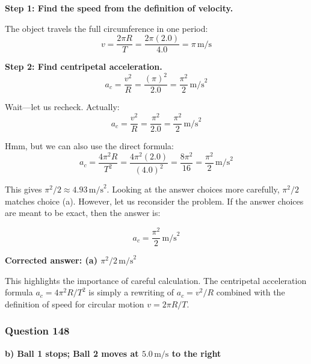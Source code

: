 \documentclass[12pt,letterpaper]{article}
\begin{document}
\begin{explanationbox}
\textbf{Step 1: Find the speed from the definition of velocity.}

The object travels the full circumference in one period:
\[
v = \frac{2\pi R}{T} = \frac{2\pi(2.0)}{4.0} = \pi\,\text{m/s}
\]

\textbf{Step 2: Find centripetal acceleration.}
\[
a_c = \frac{v^2}{R} = \frac{(\pi)^2}{2.0} = \frac{\pi^2}{2}\,\text{m/s}^2
\]

Wait---let us recheck. Actually:
\[
a_c = \frac{v^2}{R} = \frac{\pi^2}{2.0} = \frac{\pi^2}{2}\,\text{m/s}^2
\]

Hmm, but we can also use the direct formula:
\[
a_c = \frac{4\pi^2 R}{T^2} = \frac{4\pi^2(2.0)}{(4.0)^2} = \frac{8\pi^2}{16} = \frac{\pi^2}{2}\,\text{m/s}^2
\]

This gives $\pi^2/2 \approx 4.93\,\text{m/s}^2$. Looking at the answer choices more carefully, $\pi^2/2$ matches choice (a). However, let us reconsider the problem. If the answer choices are meant to be exact, then the answer is:

\[
a_c = \frac{\pi^2}{2}\,\text{m/s}^2
\]

\textbf{Corrected answer: (a) $\pi^2/2\,\text{m/s}^2$}

This highlights the importance of careful calculation. The centripetal acceleration formula $a_c = 4\pi^2 R/T^2$ is simply a rewriting of $a_c = v^2/R$ combined with the definition of speed for circular motion $v = 2\pi R/T$.
\end{explanationbox}

\subsubsection*{Question 148}

\begin{answerbox}
\textbf{b) Ball 1 stops; Ball 2 moves at $5.0\,\text{m/s}$ to the right}
\end{answerbox}
\end{document}
